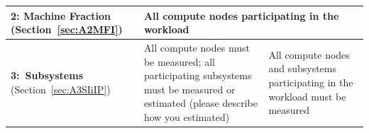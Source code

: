 \begin{table}
\begin{tabular}{|p{3cm}|p{3.5cm}|p{3.5cm}|p{3.5cm}|}







\textbf{2: Machine Fraction} (Section~\ref{sec:A2MFI})  &
\multicolumn{3}{p{3\tablecolumnwidth}|}{
      \begin{minipage}[t]{3\tablecolumnwidth}
        All compute nodes participating in the workload
      \end{minipage}
} \\

\hline

\textbf{3:~Subsystems } (Section~\ref{sec:A3SIiIP}) &
\multicolumn{2}{p{2\tablecolumnwidth}|}{
      \begin{minipage}[t]{2\tablecolumnwidth}
        All compute nodes must be measured; all participating subsystems must be measured or estimated (please describe how you estimated)
      \end{minipage}
} &
All compute nodes and subsystems participating in the workload must be measured \\
\hline


\end{tabular}
\end{table}
